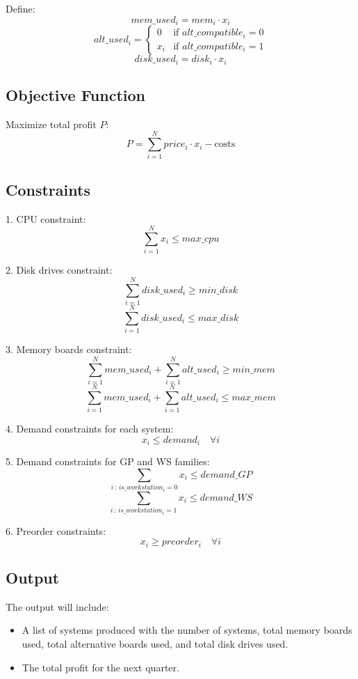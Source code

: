 \documentclass{article}
\begin{document}
Define:
\[
mem\_used_i = mem_i \cdot x_i
\]
\[
alt\_used_i = \begin{cases} 
0 & \text{if } alt\_compatible_i = 0 \\
x_i & \text{if } alt\_compatible_i = 1 
\end{cases}
\]
\[
disk\_used_i = disk_i \cdot x_i
\]

\subsection*{Objective Function}
Maximize total profit \( P \):
\[
P = \sum_{i=1}^{N} price_i \cdot x_i - \text{costs}
\]

\subsection*{Constraints}
1. CPU constraint:
\[
\sum_{i=1}^{N} x_i \leq max\_cpu
\]

2. Disk drives constraint:
\[
\sum_{i=1}^{N} disk\_used_i \geq min\_disk
\]
\[
\sum_{i=1}^{N} disk\_used_i \leq max\_disk
\]

3. Memory boards constraint:
\[
\sum_{i=1}^{N} mem\_used_i + \sum_{i=1}^{N} alt\_used_i \geq min\_mem
\]
\[
\sum_{i=1}^{N} mem\_used_i + \sum_{i=1}^{N} alt\_used_i \leq max\_mem
\]

4. Demand constraints for each system:
\[
x_i \leq demand_i \quad \forall i
\]

5. Demand constraints for GP and WS families:
\[
\sum_{i \, : \, is\_workstation_i = 0} x_i \leq demand\_GP
\]
\[
\sum_{i \, : \, is\_workstation_i = 1} x_i \leq demand\_WS
\]

6. Preorder constraints:
\[
x_i \geq preorder_i \quad \forall i
\]

\subsection*{Output}
The output will include:
\begin{itemize}
    \item A list of systems produced with the number of systems, total memory boards used, total alternative boards used, and total disk drives used.
    \item The total profit for the next quarter.
\end{itemize}
\end{document}
